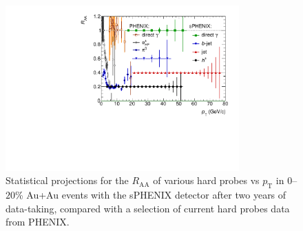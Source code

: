 \begin{figure}[]
  \begin{center}

    \includegraphics[width=0.8\textwidth]{figs/sPHENIX_MIE_master_AuAu_projections_tshirtcompare}
  \end{center}

  \caption[Statistical projections of $R_\mathrm{AA}$ for hard probes
  in central Au+Au events with the sPHENIX detector after two years of
  data-taking, and kinematic reach of various jet quenching
  observables from previous and future RHIC and LHC
  data-taking]{\label{fig:guntherplot} Statistical projections
    for the $R_\mathrm{AA}$ of various hard probes vs $p_\mathrm{T}$
    in $0$--$20$\% Au+Au events with the sPHENIX detector after two
    years of data-taking, compared with a selection of current hard
    probes data from PHENIX.  
    }
\end{figure}
